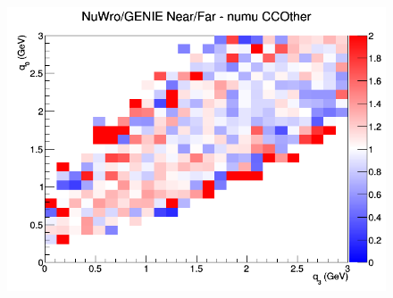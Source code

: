 \documentclass[12pt]{article}
\begin{document}
\begin{figure}[h]
\endminipage
{}
\includegraphics[width=\linewidth]{eff_q0_q3/FGT/ratios/CCOther_NuWro_GENIE_numu_NF_q3_q0.png}
\endminipage
\newline
\end{figure}
\clearpage
\end{document}
